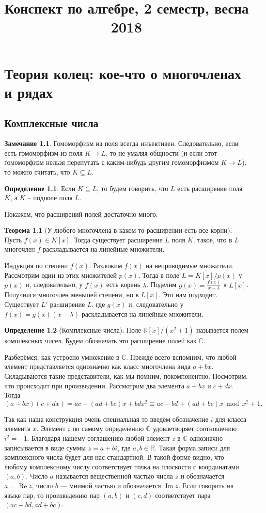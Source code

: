 \documentclass[10pt,a4paper,oneside]{book}
\theoremstyle{definition}
\newtheorem*{rem}{Замечание}
\newtheorem{defn}{Определение}
\newtheorem{thm}{Теорема}
\renewcommand{\mod}{\,\operatorname{mod}\,}
\newcommand{\mb}[1]{\mathbb{#1}}
\newcommand{\im}{\operatorname{Im}}
\newcommand{\re}{\operatorname{Re}}
\def\thrm{\begin{thm}}
\def\ethrm{\end{thm}}
\def\dfn{\begin{defn}}
\def\edfn{\end{defn}}
\def\rm{\begin{rem}}
\def\erm{\end{rem}}
\begin{document}
\title{Конспект по алгебре, 2 семестр, весна 2018}
\date{}
\author{}
\maketitle
\tableofcontents

\setcounter{chapter}{1}

\chapter{Теория колец: кое-что о многочленах и рядах}

\section{Комплексные числа}
\rm Гомоморфизм из поля всегда инъективен. Следовательно, если есть гомоморфизм из поля $K\to L$, то не умаляя общности (и если этот гомоморфизм нельзя перепутать с каким-нибудь другим гомоморфизмом $K\to L$), то можно считать, что $K\subseteq L$.
\erm

\dfn Если $K\subseteq L$, то будем говорить, что $L$ есть расширение поля $K$, а $K$ -- подполе поля $L$.
\edfn
Покажем, что расширений полей достаточно много.
\thrm[У любого многочлена в каком-то расширении есть все корни] Пусть $f(x)\in K[x]$. Тогда существует расширение $L$ поля $K$, такое, что в $L$ многочлен $f$ раскладывается на линейные множители.  
\ethrm
\proof Индукция по степени $f(x)$. Разложим $f(x)$ на неприводимые множители. Рассмотрим один из этих множителей $p(x)$. Тогда в поле $L=K[x]/p(x)$ у $p(x)$ и, следовательно, у $f(x)$ есть корень $\lambda$. Поделим $g(x)=\frac{f(x)}{x-\lambda}$ в $L[x]$. Получился многочлен меньшей степени, но в $L[x]$. Это нам подходит. Существует $L'$ раcширение $L$, где  $g(x)$ и, следовательно у $f(x)=g(x)(x-\lambda)$ раскладывается на линейные множители.
\endproof

\dfn[Комплексные числа] Поле $\mb R[x]/(x^2 + 1)$ называется полем комплексных чисел. Будем обозначать это расширение полей как $\mb C$.
\edfn

Разберёмся, как устроено умножение в $\mb C$. Прежде всего вспомним, что любой элемент представляется однозначно как класс многочлена вида $a+bx$. Складываются такие представители, как мы помним, покомпонентно. Посмотрим, что происходит при произведении. Рассмотрим два элемента $a+bx$ и $c+dx$. Тогда
$$(a+bx)(c+dx)=ac+(ad+bc)x+bdx^2\equiv ac-bd + (ad+bc)x \mod x^2+1.$$

Так как наша конструкция очень специальная то введём обозначение $i$ для класса элемента $x$. Элемент $i$ по самому определению $\mb C$ удовлетворяет соотношению $i^2=-1$. Благодаря нашему соглашению любой элемент $z$ в $\mb C$ однозначно записывается в виде суммы $z=a+bi$, где $a,b\in \mb R$. Такая форма записи для комплексного числа будет для нас стандартной. В такой форме видно, что любому комплексному числу соответствует точка на плоскости с координатами $(a,b)$. Число $a$ называется вещественной частью числа $z$ и обозначается $a=\re z$, число $b$ --- мнимой частью и обозначается $\im z$. Если говорить на языке пар, то произведению пар $(a,b)$ и $(c,d)$ соответствует пара $(ac-bd,ad+bc)$.
 
\end{document}
